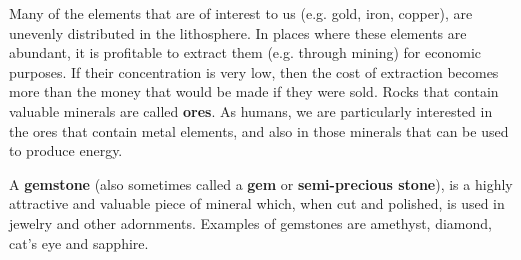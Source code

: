 Many of the elements that are of interest to us (e.g. gold, iron, copper), are unevenly distributed in the lithosphere. In places where these elements are abundant, it is profitable to extract them (e.g. through mining) for economic purposes. If their concentration is very low, then the cost of extraction becomes more than the money that would be made if they were sold. Rocks that contain valuable minerals are called \textbf{ores}. As humans, we are particularly interested in the ores that contain metal elements, and also in those minerals that can be used to produce energy.


\begin{IFact}{
A \textbf{gemstone} (also sometimes called a \textbf{gem} or \textbf{semi-precious stone}), is a highly attractive and valuable piece of mineral which, when cut and polished, is used in jewelry and other adornments. Examples of gemstones are amethyst, diamond, cat's eye and sapphire.
}
\end{IFact}





